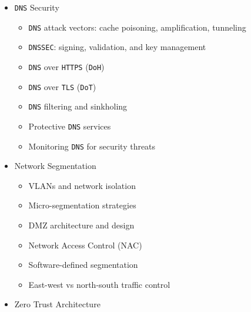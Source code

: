 \documentclass[
]{article}
\providecommand{\tightlist}{%
  \setlength{\itemsep}{0pt}\setlength{\parskip}{0pt}}
\begin{document}
\begin{itemize}
  \begin{itemize}
  \tightlist
  \item
    Public Key Infrastructure components
  \item
    Certificate Authorities: root, intermediate, and leaf certificates
  \item
    Certificate lifecycle management
  \item
    Certificate revocation: CRL and \texttt{OCSP}
  \item
    \texttt{Let\textquotesingle{}s\ Encrypt} and automated certificate
    management (\texttt{ACME})
  \item
    Certificate pinning
  \item
    Private \texttt{CA} deployment and management
  \end{itemize}
\item
  \texttt{DNS} Security

  \begin{itemize}
  \tightlist
  \item
    \texttt{DNS} attack vectors: cache poisoning, amplification,
    tunneling
  \item
    \texttt{DNSSEC}: signing, validation, and key management
  \item
    \texttt{DNS} over \texttt{HTTPS} (\texttt{DoH})
  \item
    \texttt{DNS} over \texttt{TLS} (\texttt{DoT})
  \item
    \texttt{DNS} filtering and sinkholing
  \item
    Protective \texttt{DNS} services
  \item
    Monitoring \texttt{DNS} for security threats
  \end{itemize}
\item
  Network Segmentation

  \begin{itemize}
  \tightlist
  \item
    VLANs and network isolation
  \item
    Micro-segmentation strategies
  \item
    DMZ architecture and design
  \item
    Network Access Control (NAC)
  \item
    Software-defined segmentation
  \item
    East-west vs north-south traffic control
  \end{itemize}
\item
  Zero Trust Architecture


\end{itemize}
\end{document}
